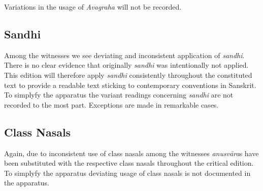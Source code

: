 \documentclass[12pt]{article}%
\begin{document}
Variations in the usage of \textit{Avagraha} will not be recorded. 

\subsection{Sandhi}

Among the witnesses we see deviating and inconsistent application of \textit{sandhi}. There is no clear evidence that originally \textit{sandhi} was intentionally not applied. This edition will therefore apply \textit{sandhi} consistently throughout the constituted text to provide a readable text sticking to contemporary conventions in Sanskrit. To simplyfy the apparatus the variant readings concerning \textit{sandhi} are not recorded to the most part. Exceptions are made in remarkable cases. 

\subsection{Class Nasals}

Again, due to inconsistent use of class nasals among the witnesses \textit{anusvāra}s have been substituted with the respective class nasals throughout the critical edition. To simplyfy the apparatus deviating usage of class nasals is not documented in the apparatus.
\clearpage
\end{document}

